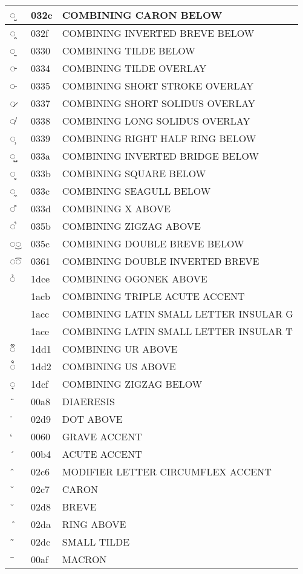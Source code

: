 \documentclass[12pt,letterpaper,openany]{book}
\begin{document}
\begin{center}
\begin{supertabular}{|m{0.25in}|m{0.5in}|m{4in}|}
◌̬ & 032c & COMBINING CARON BELOW\\\hline
◌̯ & 032f & COMBINING INVERTED BREVE BELOW\\\hline
◌̰ & 0330 & COMBINING TILDE BELOW\\\hline
◌̴ & 0334 & COMBINING TILDE OVERLAY\\\hline
◌̵ & 0335 & COMBINING SHORT STROKE OVERLAY\\\hline
◌̷ & 0337 & COMBINING SHORT SOLIDUS OVERLAY\\\hline
◌̸ & 0338 & COMBINING LONG SOLIDUS OVERLAY\\\hline
◌̹ & 0339 & COMBINING RIGHT HALF RING BELOW\\\hline
◌̺ & 033a & COMBINING INVERTED BRIDGE BELOW\\\hline
◌̻ & 033b & COMBINING SQUARE BELOW\\\hline
◌̼ & 033c & COMBINING SEAGULL BELOW\\\hline
◌̽ & 033d & COMBINING X ABOVE\\\hline
◌͛ & 035b & COMBINING ZIGZAG ABOVE\\\hline
◌͜◌ & 035c & COMBINING DOUBLE BREVE BELOW\\\hline
◌͡◌ & 0361 & COMBINING DOUBLE INVERTED BREVE\\\hline
◌᷎ & 1dce & COMBINING OGONEK ABOVE\\\hline
◌᫋ & 1acb & COMBINING TRIPLE ACUTE ACCENT\\\hline
◌ᫌ & 1acc & COMBINING LATIN SMALL LETTER INSULAR G\\\hline
◌ᫎ & 1ace & COMBINING LATIN SMALL LETTER INSULAR T\\\hline
◌᷑ & 1dd1 & COMBINING UR ABOVE\\\hline
◌᷒ & 1dd2 & COMBINING US ABOVE\\\hline
◌᷏ & 1dcf & COMBINING ZIGZAG BELOW\\\hline
¨ & 00a8 & DIAERESIS\\\hline
˙ & 02d9 & DOT ABOVE\\\hline
` & 0060 & GRAVE ACCENT\\\hline
´ & 00b4 & ACUTE ACCENT\\\hline
ˆ & 02c6 & MODIFIER LETTER CIRCUMFLEX ACCENT\\\hline
ˇ & 02c7 & CARON\\\hline
˘ & 02d8 & BREVE\\\hline
˚ & 02da & RING ABOVE\\\hline
˜ & 02dc & SMALL TILDE\\\hline
¯ & 00af & MACRON\\\hline

\end{supertabular}
\end{center}
\end{document}
